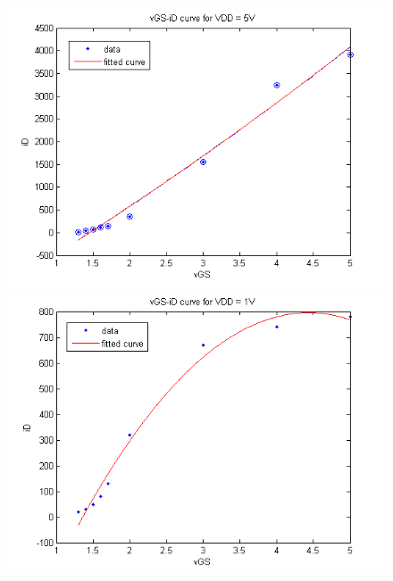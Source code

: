 \documentclass{article}
\begin{document}
\begin{figure}[H]
\begin{minipage}{.6\textwidth}
\includegraphics[scale=.4]{fig1}
\end{minipage}
\begin{minipage}{.6\textwidth}
\includegraphics[scale=.4]{fig2}
\end{minipage}
\end{figure}
\end{document}
